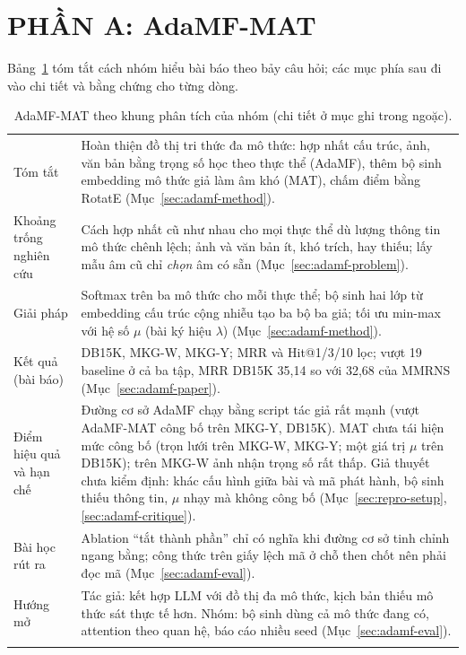 \documentclass[conference]{IEEEtran}
\begin{document}
\section*{PHẦN A: AdaMF-MAT}

Bảng~\ref{tab:frame-adamf} tóm tắt cách nhóm hiểu bài báo theo bảy câu hỏi; các mục phía sau đi
vào chi tiết và bằng chứng cho từng dòng.

\begin{table}[t]
\caption{AdaMF-MAT theo khung phân tích của nhóm (chi tiết ở mục ghi trong ngoặc).}
\label{tab:frame-adamf}
\centering\footnotesize
\renewcommand{\arraystretch}{1.15}
\begin{tabular}{>{\raggedright\arraybackslash}p{1.95cm} >{\raggedright\arraybackslash}p{5.95cm}}
\toprule
Tóm tắt & Hoàn thiện đồ thị tri thức đa mô thức: hợp nhất cấu trúc, ảnh, văn bản bằng trọng số học
theo thực thể (AdaMF), thêm bộ sinh embedding mô thức giả làm âm khó (MAT), chấm điểm bằng RotatE
(Mục~\ref{sec:adamf-method}). \\ \addlinespace[2pt]
Khoảng trống nghiên cứu & Cách hợp nhất cũ như nhau cho mọi thực thể dù lượng thông tin mô thức chênh lệch;
ảnh và văn bản ít, khó trích, hay thiếu; lấy mẫu âm cũ chỉ \emph{chọn} âm có sẵn
(Mục~\ref{sec:adamf-problem}). \\ \addlinespace[2pt]
Giải pháp & Softmax trên ba mô thức cho mỗi thực thể; bộ sinh hai lớp từ embedding cấu trúc cộng
nhiễu tạo ba bộ ba giả; tối ưu min-max với hệ số $\mu$ (bài ký hiệu $\lambda$) (Mục~\ref{sec:adamf-method}). \\ \addlinespace[2pt]
Kết quả (bài báo) & DB15K, MKG-W, MKG-Y; MRR và Hit@1/3/10 lọc; vượt 19 baseline ở cả ba tập,
MRR DB15K 35,14 so với 32,68 của MMRNS (Mục~\ref{sec:adamf-paper}). \\ \addlinespace[2pt]
Điểm hiệu quả và hạn chế & Đường cơ sở AdaMF chạy bằng script tác giả rất mạnh (vượt AdaMF-MAT công bố trên
MKG-Y, DB15K). MAT chưa tái hiện mức công bố (trọn lưới trên MKG-W, MKG-Y; một giá trị $\mu$ trên
DB15K); trên MKG-W ảnh nhận trọng số rất thấp. Giả thuyết chưa kiểm định: khác cấu hình giữa bài và
mã phát hành, bộ sinh thiếu thông tin, $\mu$ nhạy mà không công bố (Mục~\ref{sec:repro-setup},
\ref{sec:adamf-critique}). \\ \addlinespace[2pt]
Bài học rút ra & Ablation ``tắt thành phần'' chỉ có nghĩa khi đường cơ sở tinh chỉnh ngang bằng; công
thức trên giấy lệch mã ở chỗ then chốt nên phải đọc mã (Mục~\ref{sec:adamf-eval}). \\ \addlinespace[2pt]
Hướng mở & Tác giả: kết hợp LLM với đồ thị đa mô thức, kịch bản thiếu mô thức sát thực tế hơn.
Nhóm: bộ sinh dùng cả mô thức đang có, attention theo quan hệ, báo cáo nhiều seed
(Mục~\ref{sec:adamf-eval}). \\ \addlinespace[2pt]
\bottomrule
\end{tabular}
\end{table}
\end{document}
